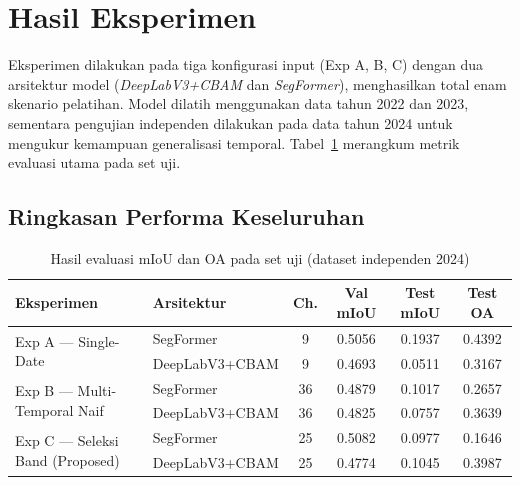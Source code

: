 
\section{Hasil Eksperimen}

Eksperimen dilakukan pada tiga konfigurasi input (Exp A, B, C) dengan dua arsitektur model
(\textit{DeepLabV3+CBAM} dan \textit{SegFormer}), menghasilkan total enam skenario pelatihan.
Model dilatih menggunakan data tahun 2022 dan 2023, sementara pengujian independen dilakukan 
pada data tahun 2024 untuk mengukur kemampuan generalisasi temporal.
Tabel~\ref{tab:hasil_utama} merangkum metrik evaluasi utama pada set uji.

\subsection{Ringkasan Performa Keseluruhan}

\begin{table}[H]
    \centering
    \caption{Hasil evaluasi mIoU dan OA pada set uji (dataset independen 2024)}
    \label{tab:hasil_utama}
    \begin{tabularx}{\textwidth}{|X|l|c|c|c|c|}
    \hline
    \textbf{Eksperimen} & \textbf{Arsitektur} & \textbf{Ch.} & \textbf{Val mIoU} & \textbf{Test mIoU} & \textbf{Test OA} \\
    \hline
    \multirow{2}{*}{Exp A --- Single-Date} & SegFormer        & 9  & 0.5056 & 0.1937 & 0.4392 \\
                                          & DeepLabV3+CBAM   & 9  & 0.4693 & 0.0511 & 0.3167 \\
    \hline
    \multirow{2}{*}{Exp B --- Multi-Temporal Naif} & SegFormer & 36 & 0.4879 & 0.1017 & 0.2657 \\
                                                  & DeepLabV3+CBAM & 36 & 0.4825 & 0.0757 & 0.3639 \\
    \hline
    \multirow{2}{*}{Exp C --- Seleksi Band (Proposed)} & SegFormer       & 25 & 0.5082 & 0.0977 & 0.1646 \\
                                           & DeepLabV3+CBAM  & 25 & 0.4774 & 0.1045 & 0.3987 \\
    \hline
    \end{tabularx}
\end{table}

